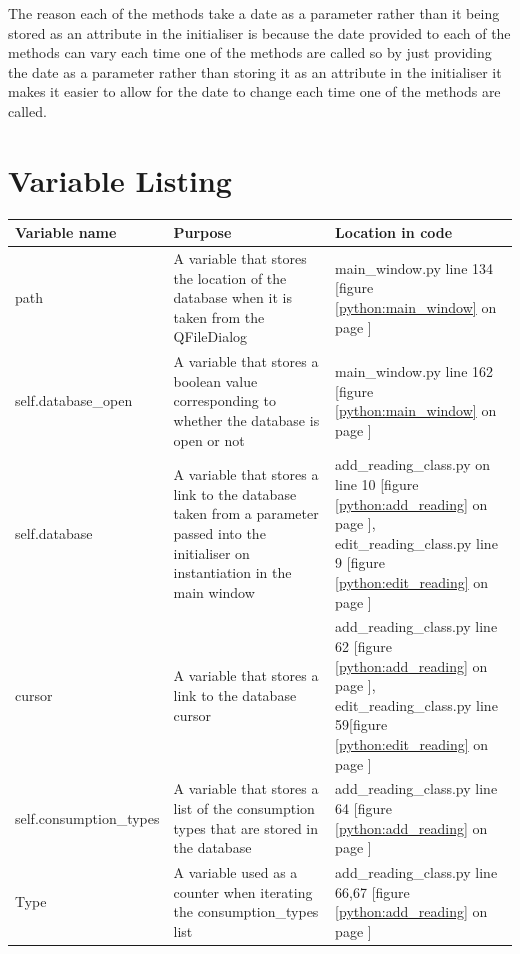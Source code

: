 The reason each of the methods take a date as a parameter rather than it being stored as an attribute in the initialiser is because the date provided to each of the methods can vary each time one of the methods are called so by just providing the date as a parameter rather than storing it as an attribute in the initialiser it makes it easier to allow for the date to change each time one of the methods are called.

\section{Variable Listing}
\begin{center}
	\begin{tabular}{|p{4cm}|p{4.5cm}|p{4.5cm}|}
	\hline
	\textbf{Variable name} & \textbf{Purpose} & \textbf{Location in code} \\ \hline
	path & A variable that stores the location of the database when it is taken from the QFileDialog & main\_window.py line 134 [figure \ref{python:main_window} on page \pageref{python:main_window} ]\\ \hline
	self.database\_open & A variable that stores a boolean value corresponding to whether the database is open or not &  main\_window.py line 162 [figure \ref{python:main_window} on page \pageref{python:main_window}] \\ \hline
	self.database & A variable that stores a link to the database taken from a parameter passed into the initialiser on instantiation in the main window & add\_reading\_class.py on line 10 [figure \ref{python:add_reading} on page \pageref{python:add_reading}], edit\_reading\_class.py line 9 [figure \ref{python:edit_reading} on page \pageref{python:edit_reading}] \\ \hline	
	cursor & A variable that stores a link to the database cursor & add\_reading\_class.py line 62 [figure \ref{python:add_reading} on page \pageref{python:add_reading}], edit\_reading\_class.py line 59[figure \ref{python:edit_reading} on page \pageref{python:edit_reading}] \\ \hline
	self.consumption\_types & A variable that stores a list of the consumption types that are stored in the database & add\_reading\_class.py line 64 [figure \ref{python:add_reading} on page \pageref{python:add_reading}] \\ \hline
	Type & A variable used as a counter when iterating the consumption\_types list & add\_reading\_class.py line 66,67 [figure \ref{python:add_reading} on page \pageref{python:add_reading}] \\ \hline

\end{tabular}
\end{center}
